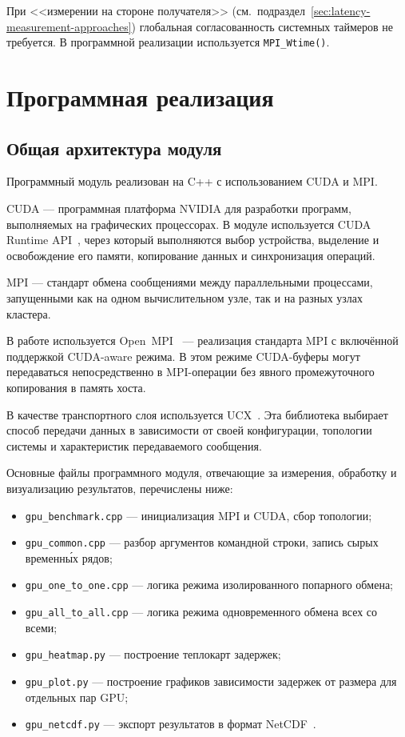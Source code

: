 \documentclass[a4paper,14pt]{extarticle}
\begin{document}
При <<измерении на стороне получателя>> (см.~подраздел~\ref{sec:latency-measurement-approaches}) глобальная согласованность системных таймеров не требуется. В программной реализации используется \texttt{MPI\_Wtime()}.

\newpage
\section{Программная реализация}

\subsection{Общая архитектура модуля}

Программный модуль реализован на C++ с использованием CUDA и MPI.

CUDA --- программная платформа NVIDIA для разработки программ, выполняемых на графических процессорах. В модуле используется CUDA Runtime API~\cite{cudaruntime}, через который выполняются выбор устройства, выделение и освобождение его памяти, копирование данных и синхронизация операций.

MPI --- стандарт обмена сообщениями между параллельными процессами, запущенными как на одном вычислительном узле, так и на разных узлах кластера.

В работе используется Open~MPI~\cite{openmpi} --- реализация стандарта MPI с включённой поддержкой CUDA-aware режима. В этом режиме CUDA-буферы могут передаваться непосредственно в MPI-операции без явного промежуточного копирования в память хоста.

В качестве транспортного слоя используется UCX~\cite{ucx}. Эта библиотека выбирает способ передачи данных в зависимости от своей конфигурации, топологии системы и характеристик передаваемого сообщения.

Основные файлы программного модуля, отвечающие за измерения, обработку и визуализацию результатов, перечислены ниже:
\begin{itemize}[leftmargin=2.1cm, itemsep=0.15em, topsep=0.15em, parsep=0pt, partopsep=0pt]
	\item \texttt{gpu\_benchmark.cpp} --- инициализация MPI и CUDA, сбор топологии;
	\item \texttt{gpu\_common.cpp} --- разбор аргументов командной строки, запись сырых временны́х рядов;
	\item \texttt{gpu\_one\_to\_one.cpp} --- логика режима изолированного попарного обмена;
	\item \texttt{gpu\_all\_to\_all.cpp} --- логика режима одновременного обмена всех со всеми;
	\item \texttt{gpu\_heatmap.py} --- построение теплокарт задержек;
	\item \texttt{gpu\_plot.py} --- построение графиков зависимости задержек от размера для отдельных пар GPU;
	\item \texttt{gpu\_netcdf.py} --- экспорт результатов в формат NetCDF~\cite{netcdf}.
\end{itemize}
\end{document}
